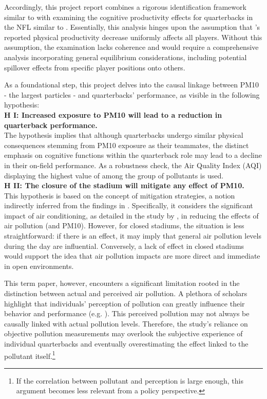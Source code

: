 \documentclass[12pt,a4paper]{article}
\begin{document}
Accordingly, this project report combines a rigorous identification framework similar to \citet{lichter2017} with examining the cognitive productivity effects for quarterbacks in the NFL similar to \citet{heintz2022}. Essentially, this analysis hinges upon the assumption that \citeauthor{lichter2017}'s reported physical productivity decrease uniformly affects all players. Without this assumption, the examination lacks coherence and would require a comprehensive analysis incorporating general equilibrium considerations, including potential spillover effects from specific player positions onto others.

As a foundational step, this project delves into the causal linkage between PM10 - the largest particles - and quarterbacks' performance, as visible in the following hypothesis: \\[0.2cm]
\textbf{H I: Increased exposure to PM10 will lead to a reduction in quarterback performance. } \\[0.2cm]
The hypothesis implies that although quarterbacks undergo similar physical consequences stemming from PM10 exposure as their teammates, the distinct emphasis on cognitive functions within the quarterback role may lead to a decline in their on-field performance. As a robustness check, the Air Quality Index (AQI) displaying the highest value of among the group of pollutants is used. \\[0.2cm]
\textbf{H II: The closure of the stadium will mitigate any effect of PM10.} \\[0.2cm]
This hypothesis is based on the concept of mitigation strategies, a notion indirectly inferred from the findings in \citet{deschenes2017}. Specifically, it considers the significant impact of air conditioning, as detailed in the study by \citet{lin2013}, in reducing the effects of air pollution (and PM10). However, for closed stadiums, the situation is less straightforward: if there is an effect, it may imply that general air pollution levels during the day are influential. Conversely, a lack of effect in closed stadiums would support the idea that air pollution impacts are more direct and immediate in open environments.

This term paper, however, encounters a significant limitation rooted in the distinction between actual and perceived air pollution. A plethora of scholars highlight that individuals' perception of pollution can greatly influence their behavior and performance (e.g. \citealp{rehdanz2008,schumacher2008,mackerron2009,chiarini2020,gong2020,claeson2013}). This perceived pollution may not always be causally linked with actual pollution levels. Therefore, the study's reliance on objective pollution measurements may overlook the subjective experience of individual quarterbacks and eventually overestimating the effect linked to the pollutant itself.\footnote{If the correlation between pollutant and perception is large enough, this argument becomes less relevant from a policy perspective.}
\end{document}
